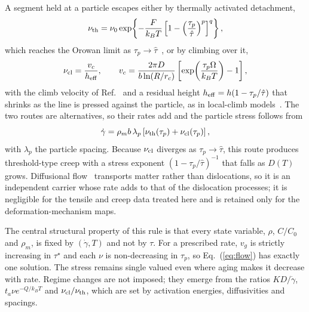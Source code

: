 \documentclass[aps,prl,twocolumn,superscriptaddress,amsmath,amssymb,floatfix]{revtex4-2}
\newcommand{\gd}{\dot\gamma}
\newcommand{\ts}{\tau^{\star}}
\newcommand{\kT}{k_BT}
\begin{document}
A segment held at a particle escapes either by thermally activated detachment,
\begin{equation}
\nu_{\rm th}=\nu_0\exp\!\left\{-\frac{F}{\kT}\left[1-\left(\frac{\tau_p}{\hat\tau}\right)^{p}\right]^{q}\right\},
\label{eq:nuth}
\end{equation}
which reaches the Orowan limit as $\tau_p\to\hat\tau$~\cite{KocksArgonAshby,RoslerArzt}, or by climbing over it,
\begin{equation}
\nu_{\rm cl}=\frac{v_c}{h_{\rm eff}},\qquad
v_c=\frac{2\pi D}{b\ln(R/r_c)}\left[\exp\!\left(\frac{\tau_p\Omega}{\kT}\right)-1\right],
\label{eq:nucl}
\end{equation}
with the climb velocity of Ref.~\cite{HirthLothe} and a residual height $h_{\rm eff}=h(1-\tau_p/\hat\tau)$ that shrinks as the line is pressed against the particle, as in local-climb models~\cite{BrownHam,ArztAshby1982}. The two routes are alternatives, so their rates add and the particle stress follows from
\begin{equation}
\gd=\rho_mb\,\lambda_p\left[\nu_{\rm th}(\tau_p)+\nu_{\rm cl}(\tau_p)\right],
\label{eq:taup}
\end{equation}
with $\lambda_p$ the particle spacing. Because $\nu_{\rm cl}$ diverges as $\tau_p\to\hat\tau$, this route produces threshold-type creep with a stress exponent $(1-\tau_p/\hat\tau)^{-1}$ that falls as $D(T)$ grows. Diffusional flow~\cite{Nabarro1948,Herring1950,Coble1963,FrostAshby} transports matter rather than dislocations, so it is an independent carrier whose rate adds to that of the dislocation processes; it is negligible for the tensile and creep data treated here and is retained only for the deformation-mechanism maps.

The central structural property of this rule is that every state variable, $\rho$, $C/C_0$ and $\rho_m$, is fixed by $(\gd,T)$ and not by $\tau$. For a prescribed rate, $v_g$ is strictly increasing in $\ts$ and each $\nu$ is non-decreasing in $\tau_p$, so Eq.~(\ref{eq:flow}) has exactly one solution. The stress remains single valued even where aging makes it decrease with rate. Regime changes are not imposed; they emerge from the ratios $KD/\gd$, $t_a\nu e^{-Q/\kT}$ and $\nu_{\rm cl}/\nu_{\rm th}$, which are set by activation energies, diffusivities and spacings.
\end{document}
